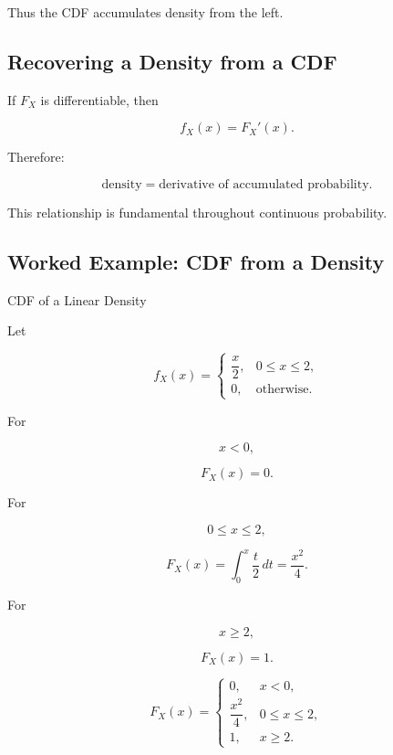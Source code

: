 Thus the CDF accumulates density from the left.

\subsection{Recovering a Density from a CDF}
\label{subsec:recover-density-from-cdf}

If \(F_X\) is differentiable, then

\[
\boxed{
f_X(x)
=
F_X'(x).
}
\]

Therefore:

\[
\boxed{
\text{density}
=
\text{derivative of accumulated probability}.
}
\]

This relationship is fundamental throughout continuous probability.

\subsection{Worked Example: CDF from a Density}
\label{subsec:worked-cdf-from-density}

\begin{workedexamplebox}{CDF of a Linear Density}

Let

\[
f_X(x)
=
\begin{cases}
\dfrac{x}{2},&0\leq x\leq2,\\
0,&\text{otherwise}.
\end{cases}
\]

For

\[
x<0,
\]

\[
F_X(x)=0.
\]

For

\[
0\leq x\leq2,
\]

\[
F_X(x)
=
\int_0^x\frac{t}{2}\,dt
=
\frac{x^2}{4}.
\]

For

\[
x\geq2,
\]

\[
F_X(x)=1.
\]

\begin{answerbox}
\[
\boxed{
F_X(x)
=
\begin{cases}
0,&x<0,\\[1mm]
\dfrac{x^2}{4},&0\leq x\leq2,\\[2mm]
1,&x\geq2.
\end{cases}
}
\]
\end{answerbox}

\end{workedexamplebox}

